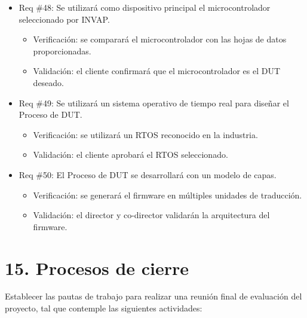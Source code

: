 \documentclass[
11pt, %
]{charter}
\begin{document}
\begin{itemize}
\item Req \#48: Se utilizará como dispositivo principal el microcontrolador seleccionado por INVAP.
\begin{itemize}
    \item Verificación: se comparará el microcontrolador con las hojas de datos proporcionadas.
    \item Validación: el cliente confirmará que el microcontrolador es el DUT deseado.
\end{itemize}

\item Req \#49: Se utilizará un sistema operativo de tiempo real para diseñar el Proceso de DUT.
\begin{itemize}
    \item Verificación: se utilizará un RTOS reconocido en la industria.
    \item Validación: el cliente aprobará el RTOS seleccionado.
\end{itemize}

\item Req \#50: El Proceso de DUT se desarrollará con un modelo de capas.
\begin{itemize}
    \item Verificación: se generará el firmware en múltiples unidades de traducción.
    \item Validación: el director y co-director validarán la arquitectura del firmware.
\end{itemize}

\end{itemize}

\section{15. Procesos de cierre}    
\label{sec:cierre}

Establecer las pautas de trabajo para realizar una reunión final de evaluación del proyecto, tal que contemple las siguientes actividades:
\end{document}

